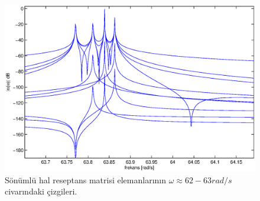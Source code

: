 \documentclass[a4paper]{report}
\begin{document}
~\\
\begin{figure}[H]
\shorthandoff{=}
\centerline{
{\includegraphics[width=1.3\textwidth]{./reseptanssdBz.eps}}}
\caption[Sönümlü hal reseptans matrisi elemanları]{Sönümlü hal reseptans matrisi elemanlarının $\omega\approx62-63 rad/s$ civarındaki çizgileri. }
\label{fig:reseptanssdbz}
\end{figure}
\clearpage
\end{document}

